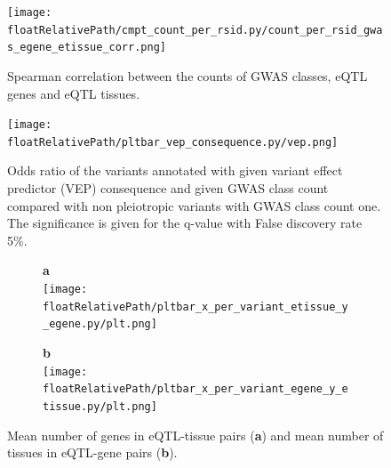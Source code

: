 %
\begin{figure}[!tbp]
\centering
%
\texttt{[image: \\floatRelativePath/cmpt\_count\_per\_rsid.py/count\_per\_rsid\_gwas\_egene\_etissue\_corr.png]}
%
\caption{Spearman correlation between the counts of GWAS classes, eQTL genes and eQTL tissues.}
\label{fig:correlation_counts}
%
\end{figure}

%
\begin{figure}[!tbp]
\centering
%
\texttt{[image: \\floatRelativePath/pltbar\_vep\_consequence.py/vep.png]}
%
\caption{Odds ratio of the variants annotated with given variant effect
predictor (VEP) consequence and given GWAS class count compared with non
pleiotropic variants with GWAS class count one. The significance is given for the
q-value with False discovery rate 5\%.}
\label{fig:vep_consequence}
%
\end{figure}

%
\begin{figure}[!tbp]
\centering
%
\begin{subfigure}[]{.32\textwidth}
\textbf{a}
\\
\texttt{[image: \\floatRelativePath/pltbar\_x\_per\_variant\_etissue\_y\_egene.py/plt.png]}
\end{subfigure}
%
\begin{subfigure}[]{.32\textwidth}
\textbf{b}
\\
\texttt{[image: \\floatRelativePath/pltbar\_x\_per\_variant\_egene\_y\_etissue.py/plt.png]}
\end{subfigure}
%
%
\caption{Mean number of genes in eQTL-tissue pairs (\textbf{a}) and mean number of tissues in eQTL-gene pairs (\textbf{b}).} \label{fig:gwas_egene_etisue_per_variant}
%
\end{figure}

